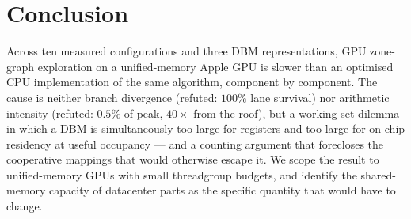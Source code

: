 \section{Conclusion}
\label{sec:concl}

Across ten measured configurations and three DBM representations, GPU zone-graph exploration
on a unified-memory Apple GPU is slower than an optimised CPU implementation of the same
algorithm, component by component. The cause is neither branch divergence (refuted: $100\%$
lane survival) nor arithmetic intensity (refuted: $0.5\%$ of peak, $40\times$ from the roof),
but a working-set dilemma in which a DBM is simultaneously too large for registers and too
large for on-chip residency at useful occupancy --- and a counting argument that forecloses
the cooperative mappings that would otherwise escape it. We scope the result to
unified-memory GPUs with small threadgroup budgets, and identify the shared-memory capacity
of datacenter parts as the specific quantity that would have to change.
